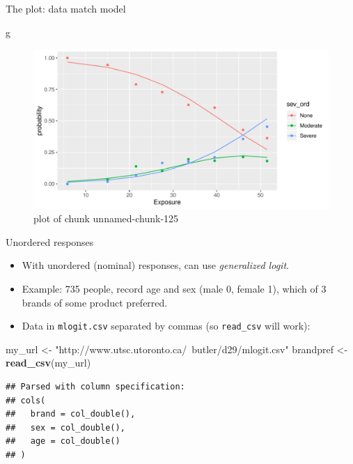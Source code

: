 \documentclass[ignorenonframetext,]{beamer}
\newenvironment{Shaded}{\begin{snugshade}}{\end{snugshade}}
\newcommand{\KeywordTok}[1]{\textcolor[rgb]{0.13,0.29,0.53}{\textbf{#1}}}
\newcommand{\NormalTok}[1]{#1}
\newcommand{\StringTok}[1]{\textcolor[rgb]{0.31,0.60,0.02}{#1}}
\begin{document}
\begin{frame}[fragile]{The plot: data match model}
\protect\hypertarget{the-plot-data-match-model}{}

\begin{Shaded}
\begin{Highlighting}[]
\NormalTok{g}
\end{Highlighting}
\end{Shaded}

\begin{figure}
\centering
\includegraphics{figure/unnamed-chunk-125-1.pdf}
\caption{plot of chunk unnamed-chunk-125}
\end{figure}

\end{frame}

\begin{frame}[fragile]{Unordered responses}
\protect\hypertarget{unordered-responses}{}

\begin{itemize}
\item
  With unordered (nominal) responses, can use \emph{generalized logit}.
\item
  Example: 735 people, record age and sex (male 0, female 1), which of 3
  brands of some product preferred.
\item
  Data in \texttt{mlogit.csv} separated by commas (so \texttt{read\_csv}
  will work):
\end{itemize}

\begin{Shaded}
\begin{Highlighting}[]
\NormalTok{my_url <-}\StringTok{ "http://www.utsc.utoronto.ca/~butler/d29/mlogit.csv"}
\NormalTok{brandpref <-}\StringTok{ }\KeywordTok{read_csv}\NormalTok{(my_url)}
\end{Highlighting}
\end{Shaded}

\begin{verbatim}
## Parsed with column specification:
## cols(
##   brand = col_double(),
##   sex = col_double(),
##   age = col_double()
## )
\end{verbatim}

\end{frame}
\end{document}
